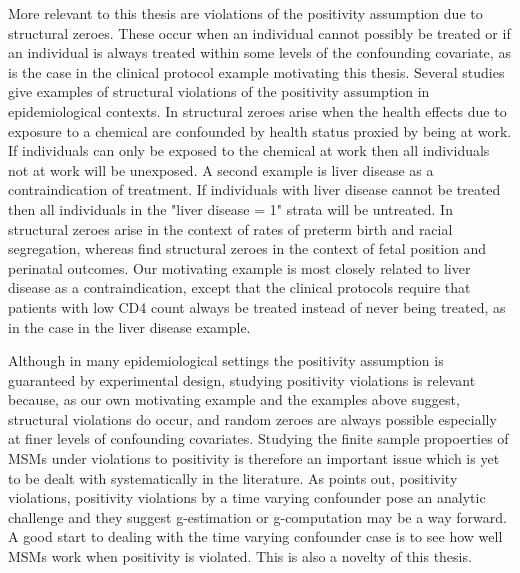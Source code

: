 \documentclass[11pt]{article}
\begin{document}
More relevant to this thesis are violations of the positivity assumption
due to structural zeroes. These occur when an individual cannot possibly
be treated or if an individual is always treated within some levels of
the confounding covariate, as is the case in the clinical protocol
example motivating this thesis. Several studies give examples of
structural violations of the positivity assumption in epidemiological
contexts. In \citet{Cole2008} structural zeroes arise when the health
effects due to exposure to a chemical are confounded by health status
proxied by being at work. If individuals can only be exposed to the
chemical at work then all individuals not at work will be unexposed. A
second example is liver disease as a contraindication of treatment. If
individuals with liver disease cannot be treated then all individuals in
the "liver disease = 1" strata will be untreated. In \citet{Messer2010}
structural zeroes arise in the context of rates of preterm birth and
racial segregation, whereas \citet{Cheng2010} find structural zeroes in
the context of fetal position and perinatal outcomes. Our motivating
example is most closely related to liver disease as a contraindication,
except that the clinical protocols require that patients with low CD4
count always be treated instead of never being treated, as in the case
in the liver disease example.

Although in many epidemiological settings the positivity assumption is
guaranteed by experimental design, studying positivity violations is
relevant because, as our own motivating example and the examples above
suggest, structural violations do occur, and random zeroes are always
possible especially at finer levels of confounding covariates. Studying
the finite sample propoerties of MSMs under violations to positivity is
therefore an important issue which is yet to be dealt with
systematically in the literature. As \citet{Westreich2010} points out,
positivity violations, positivity violations by a time varying
confounder pose an analytic challenge and they suggest g-estimation or
g-computation may be a way forward. A good start to dealing with the
time varying confounder case is to see how well MSMs work when
positivity is violated. This is also a novelty of this thesis.
\end{document}
